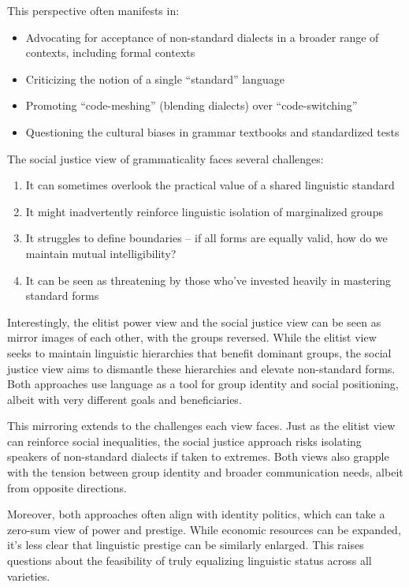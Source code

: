 This perspective often manifests in:

\begin{itemize}
    \item Advocating for acceptance of non-standard dialects in a broader range of contexts, including formal contexts
    \item Criticizing the notion of a single ``standard'' language
    \item Promoting ``code-meshing'' (blending dialects) over ``code-switching''
    \item Questioning the cultural biases in grammar textbooks and standardized tests
\end{itemize}

The social justice view of grammaticality faces several challenges:

\begin{enumerate}
    \item It can sometimes overlook the practical value of a shared linguistic standard
    \item It might inadvertently reinforce linguistic isolation of marginalized groups
    \item It struggles to define boundaries -- if all forms are equally valid, how do we maintain mutual intelligibility?
    \item It can be seen as threatening by those who've invested heavily in mastering standard forms
\end{enumerate}

Interestingly, the elitist power view and the social justice view can be seen as mirror images of each other, with the groups reversed. While the elitist view seeks to maintain linguistic hierarchies that benefit dominant groups, the social justice view aims to dismantle these hierarchies and elevate non-standard forms. Both approaches use language as a tool for group identity and social positioning, albeit with very different goals and beneficiaries.

This mirroring extends to the challenges each view faces. Just as the elitist view can reinforce social inequalities, the social justice approach risks isolating speakers of non-standard dialects if taken to extremes. Both views also grapple with the tension between group identity and broader communication needs, albeit from opposite directions.

Moreover, both approaches often align with identity politics, which can take a zero-sum view of power and prestige. While economic resources can be expanded, it's less clear that linguistic prestige can be similarly enlarged. This raises questions about the feasibility of truly equalizing linguistic status across all varieties.

